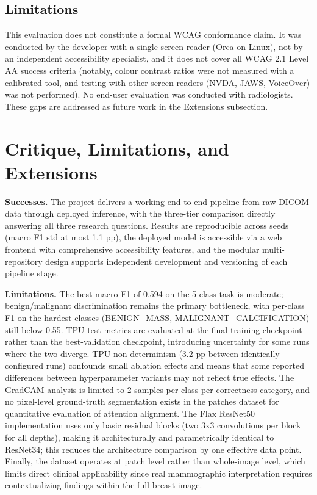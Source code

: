 \documentclass[justified,notoc,openany]{tufte-book}
\begin{document}
\subsection{Limitations}\label{limitations}

This evaluation does not constitute a formal WCAG conformance claim. It was conducted by the developer with a single screen reader (Orca on Linux), not by an independent accessibility specialist, and it does not cover all WCAG 2.1 Level AA success criteria (notably, colour contrast ratios were not measured with a calibrated tool, and testing with other screen readers (NVDA, JAWS, VoiceOver) was not performed). No end-user evaluation was conducted with radiologists. These gaps are addressed as future work in the Extensions subsection.

\section{Critique, Limitations, and Extensions}\label{critique-limitations-and-extensions}

\textbf{Successes.} The project delivers a working end-to-end pipeline from raw DICOM data through deployed inference, with the three-tier comparison directly answering all three research questions. Results are reproducible across seeds (macro F1 std at most 1.1 pp), the deployed model is accessible via a web frontend with comprehensive accessibility features, and the modular multi-repository design supports independent development and versioning of each pipeline stage.

\textbf{Limitations.} The best macro F1 of 0.594 on the 5-class task is moderate; benign/malignant discrimination remains the primary bottleneck, with per-class F1 on the hardest classes (BENIGN\_MASS, MALIGNANT\_CALCIFICATION) still below 0.55. TPU test metrics are evaluated at the final training checkpoint rather than the best-validation checkpoint, introducing uncertainty for some runs where the two diverge. TPU non-determinism (3.2 pp between identically configured runs) confounds small ablation effects and means that some reported differences between hyperparameter variants may not reflect true effects. The GradCAM analysis is limited to 2 samples per class per correctness category, and no pixel-level ground-truth segmentation exists in the patches dataset for quantitative evaluation of attention alignment. The Flax ResNet50 implementation uses only basic residual blocks (two 3x3 convolutions per block for all depths), making it architecturally and parametrically identical to ResNet34; this reduces the architecture comparison by one effective data point. Finally, the dataset operates at patch level rather than whole-image level, which limits direct clinical applicability since real mammographic interpretation requires contextualizing findings within the full breast image.
\end{document}
